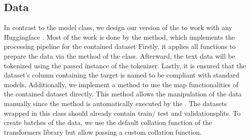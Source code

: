 \documentclass[letterpaper,10pt,english]{jupyterBook}
\begin{document}
\subsection{Data}
\label{\detokenize{PyTorchLightning:data}}
\sphinxAtStartPar
In contrast to the model class, we design our version of the  to work with any Huggingface .
Most of the work is done by the \sphinxhyphen{}method, which implements the processing pipeline for the contained dataset
Firstly, it applies all functions to prepare the data via the \sphinxhyphen{}method of the  class.
Afterward, the text data will be tokenized using the passed instance of the tokenizer.
Lastly, it is ensured that the dataset’s column containing the target is named  to be compliant with standard  models.
Additionally, we implement a method to use the map functionalities of the contained dataset directly.
This method allows the manipulation of the data manually since the \sphinxhyphen{}method is automatically executed by the .
The datasets wrapped in this class should already contain train\sphinxhyphen{}/ test\sphinxhyphen{} and validation\sphinxhyphen{}splits.
To create batches of the data, we use the default collation function of the transformers library but allow passing a custom collation function.
\end{document}
